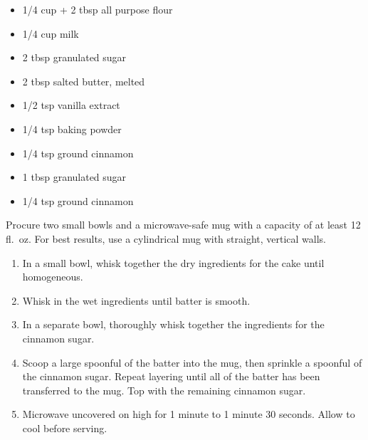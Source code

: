 \documentclass{article}
\begin{document}
\thispagestyle{firstpage}

\ingredients

\begin{minipage}{\textwidth}
\begin{multicols*}{2}
\begin{minipage}{\linewidth}
\ingredients[Cake]
\vspace{-1em}
\begin{itemize}
    \item 1/4 cup + 2 tbsp all purpose flour
    \item 1/4 cup milk
    \item 2 tbsp granulated sugar
    \item 2 tbsp salted butter, melted
    \item 1/2 tsp vanilla extract
    \item 1/4 tsp baking powder
    \item 1/4 tsp ground cinnamon
\end{itemize}
\end{minipage}

\columnbreak
\begin{minipage}{\linewidth}
\vspace{-1em}
\begin{itemize}
    \item 1 tbsp granulated sugar
    \item 1/4 tsp ground cinnamon
\end{itemize}
\end{minipage}
\end{multicols*}

\instructions
Procure two small bowls and a microwave-safe mug with a capacity of at least 12 fl.\ oz. For best results, use a cylindrical mug with straight, vertical walls.
\begin{enumerate}
    \item In a small bowl, whisk together the dry ingredients for the cake until homogeneous.
    \item Whisk in the wet ingredients until batter is smooth.
    \item In a separate bowl, thoroughly whisk together the ingredients for the cinnamon sugar.
    \item Scoop a large spoonful of the batter into the mug, then sprinkle a spoonful of the cinnamon sugar. Repeat layering until all of the batter has been transferred to the mug. Top with the remaining cinnamon sugar.
    \item Microwave uncovered on high for 1 minute to 1 minute 30 seconds. Allow to cool before serving.
\end{enumerate}
\end{minipage}

\spewfootnotes
\end{document}
